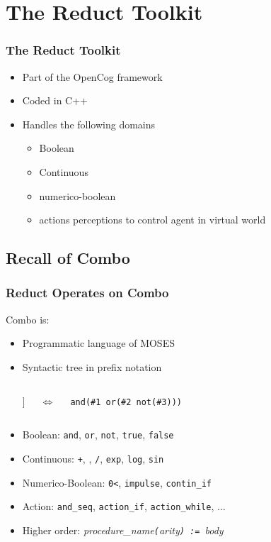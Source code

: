 \documentclass{beamer}
\newcommand{\AND}{\land}
\newcommand{\OR}{\lor}
\newcommand{\NOT}{\lnot}
\begin{document}
\section{The Reduct Toolkit}

\frame
{
  \frametitle{The Reduct Toolkit}

  \begin{itemize}[<+->]
  \item Part of the OpenCog framework
  \item Coded in C++
  \item Handles the following domains
    \begin{itemize}
    \item Boolean
    \item Continuous
    \item numerico-boolean
    \item actions perceptions to control agent in virtual world
    \end{itemize}
  \end{itemize}
}

\subsection{Recall of Combo}

\frame
{

  \frametitle{Reduct Operates on Combo}

  Combo is:
  \begin{itemize}
  \item<+-> Programmatic language of MOSES
  \item<+-> Syntactic tree in prefix notation\\
    \begin{columns}
      
      \column{0.5in}
      \Tree [.$\AND$ \alert<+>{$x$} [.$\OR$ \alert<3>{$y$} $\NOT \alert<3>{z}$ ] ]
      
      \column{0.1in}
      $\Leftrightarrow$

      \column{2.4in}
      \tt{and(\alert<3>{\#1} or(\alert<3>{\#2} not(\alert<3>{\#3})))}
      
    \end{columns}
  \item<+-> Boolean: {\tt and}, {\tt or}, {\tt not}, {\tt true}, {\tt false}
  \item<+-> Continuous:
    {\tt +}, {\tt *}, {\tt /}, {\tt exp}, {\tt log}, {\tt sin}
  \item<+-> Numerico-Boolean:
    {\tt 0<}, {\tt impulse}, {\tt contin\_if}
  \item<+-> Action:
    {\tt and\_seq},
    {\tt action\_if},
    {\tt action\_while},
    $\ldots$
  \item<+-> Higher order: {\it procedure\_name{\tt (}arity{\tt) := }body}
  \end{itemize}

}
\end{document}
